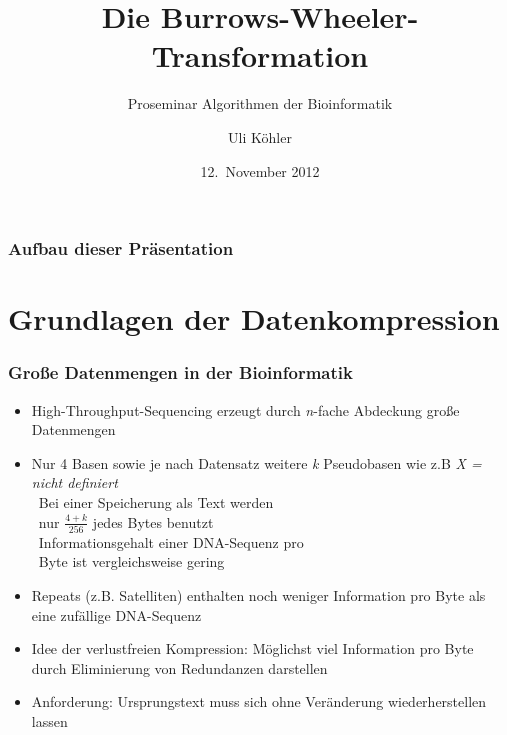 \documentclass[14pt,xcolor=dvipsnames]{beamer}
\title{Die Burrows-Wheeler-Transformation}
\subtitle{Proseminar \glqq Algorithmen der Bioinformatik\grqq}
\author{Uli Köhler}
\date{12.~November 2012}
\begin{document}
\frame{\titlepage}
\begin{frame}
\frametitle{Aufbau dieser Präsentation}
\tableofcontents
\end{frame}

\section{Grundlagen der Datenkompression}
\begin{frame}[allowframebreaks]
\frametitle{Große Datenmengen in der Bioinformatik}
  \begin{itemize}
   \item High-Throughput-Sequencing erzeugt durch \textit{n}-fache Abdeckung große Datenmengen
   \item Nur 4 Basen  sowie je nach Datensatz weitere \textit{k} Pseudobasen wie z.B \textit{X = nicht definiert}\\
   \textrightarrow\ Bei einer Speicherung als Text werden\\\quad\ nur $\frac{4+k}{256}$ jedes Bytes benutzt\\
   \textrightarrow\ Informationsgehalt einer DNA-Sequenz pro\\\quad\ Byte ist vergleichsweise gering
  \end{itemize}
\framebreak
\begin{itemize}
 \item Repeats (z.B. Satelliten) enthalten noch weniger Information pro Byte als eine zufällige DNA-Sequenz
 \item Idee der verlustfreien Kompression: Möglichst viel Information pro Byte durch Eliminierung von Redundanzen darstellen
 \item Anforderung: Ursprungstext muss sich ohne Veränderung wiederherstellen lassen
\end{itemize}

\end{frame}
\end{document}
